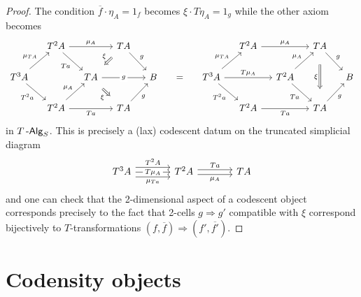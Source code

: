 \documentclass[a4paper,11pt,oneside,openany]{scrbook}
\begin{document}
\begin{proof}
    The condition $\overline{f}\cdot\eta_A=1_f$ becomes $\xi\cdot T\eta_A=1_g$
    while the other axiom becomes
    \[\begin{tikzcd}[column sep=small]
        & {T^2A} &&  TA &&&& {T^2A} && TA \\
        {T^3A} && TA && B & {=} & {T^3A} && {T^2A} && B \\
        & {T^2A} && TA &&&& {T^2A} && TA
        \arrow["Ta"', from=1-2, to=2-3]
        \arrow[""{name=0, anchor=center, inner sep=0}, "{\mu_A}", from=1-2, to=1-4]
        \arrow["g", from=1-4, to=2-5]
        \arrow["g"{description}, from=2-3, to=2-5]
        \arrow["g"', from=3-4, to=2-5]
        \arrow["Ta"', from=3-2, to=3-4]
        \arrow["{\mu_A}", from=3-2, to=2-3]
        \arrow["{T^2a}"', from=2-1, to=3-2]
        \arrow["{\mu_{TA}}", from=2-1, to=1-2]
        \arrow["\xi"', shorten <=8pt, shorten >=8pt, Rightarrow, from=1-4, to=2-3]
        \arrow["\xi"', shorten <=8pt, shorten >=8pt, Rightarrow, from=2-3, to=3-4]
        \arrow["g", from=1-10, to=2-11]
        \arrow["g"', from=3-10, to=2-11]
        \arrow["Ta"', from=2-9, to=3-10]
        \arrow["{\mu_A}", from=2-9, to=1-10]
        \arrow["\xi"', shorten <=13pt, shorten >=13pt, Rightarrow, from=1-10, to=3-10]
        \arrow["{\mu_A}", from=1-8, to=1-10]
        \arrow["{\mu_{TA}}", from=2-7, to=1-8]
        \arrow["{T^2a}"', from=2-7, to=3-8]
        \arrow["Ta"', from=3-8, to=3-10]
        \arrow["{T\mu_A}", from=2-7, to=2-9]
    \end{tikzcd}\]
    in $T\operatorname{-\mathsf{Alg}}_S$. This is precisely a (lax) codescent datum on the truncated
    simplicial diagram
    \[\begin{tikzcd}[column sep=large]
        {T^3A} & {T^2A} & TA
        \arrow["Ta", shift left=1, from=1-2, to=1-3]
        \arrow["{\mu_A}"', shift right=1, from=1-2, to=1-3]
        \arrow["{T\mu_A}"{description}, from=1-1, to=1-2]
        \arrow["{T^2A}", shift left=2, from=1-1, to=1-2]
        \arrow["{\mu_{Ta}}"', shift right=2, from=1-1, to=1-2]
    \end{tikzcd}\]
    and one can check that the 2-dimensional aspect of a codescent object
    corresponds precisely to the fact that 2-cells $g\Rightarrow g'$ compatible
    with $\xi$ correspond bijectively to $T$-transformations
    $(f,\overline{f})\Rightarrow(f',\overline{f'})$.
\end{proof}

\section{Codensity objects}
\end{document}
